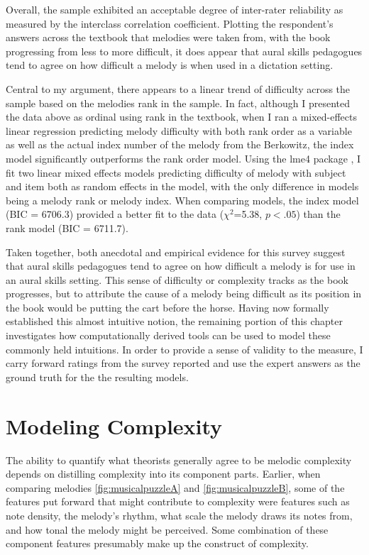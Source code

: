\documentclass[12pt,]{book}
\begin{document}
Overall, the sample exhibited an acceptable degree of inter-rater reliability as measured by the interclass correlation coefficient.
Plotting the respondent's answers across the textbook that melodies were taken from, with the book progressing from less to more difficult, it does appear that aural skills pedagogues tend to agree on how difficult a melody is when used in a dictation setting.

Central to my argument, there appears to a linear trend of difficulty across the sample based on the melodies rank in the sample.
In fact, although I presented the data above as ordinal using rank in the textbook, when I ran a mixed-effects linear regression predicting melody difficulty with both rank order as a variable as well as the actual index number of the melody from the Berkowitz, the index model significantly outperforms the rank order model.
Using the lme4 package \citep{batesFittingLinearMixedEffects2015}, I fit two linear mixed effects models predicting difficulty of melody with subject and item both as random effects in the model, with the only difference in models being a melody rank or melody index.
When comparing models, the index model (BIC = 6706.3) provided a better fit to the data (\(\chi^2\)=5.38, \(p<.05\)) than the rank model (BIC = 6711.7).

Taken together, both anecdotal and empirical evidence for this survey suggest that aural skills pedagogues tend to agree on how difficult a melody is for use in an aural skills setting.
This sense of difficulty or complexity tracks as the book progresses, but to attribute the cause of a melody being difficult as its position in the book would be putting the cart before the horse.
Having now formally established this almost intuitive notion, the remaining portion of this chapter investigates how computationally derived tools can be used to model these commonly held intuitions.
In order to provide a sense of validity to the measure, I carry forward ratings from the survey reported and use the expert answers as the ground truth for the the resulting models.

\hypertarget{modeling-complexity}{%
\section{Modeling Complexity}\label{modeling-complexity}}

The ability to quantify what theorists generally agree to be melodic complexity depends on distilling complexity into its component parts.
Earlier, when comparing melodies \ref{fig:musicalpuzzleA} and \ref{fig:musicalpuzzleB}, some of the features put forward that might contribute to complexity were features such as note density, the melody's rhythm, what scale the melody draws its notes from, and how tonal the melody might be perceived.
Some combination of these component features presumably make up the construct of complexity.
\end{document}

